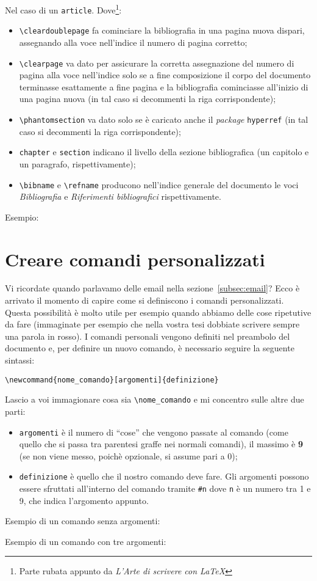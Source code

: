 
Nel caso di un \verb!article!. Dove\footnote{Parte rubata appunto da 
\textit{L'Arte di scrivere con \LaTeX{}}}:
\begin{itemize}
    \item \verb!\cleardoublepage! fa cominciare la bibliografia in una pagina 
    nuova dispari, assegnando alla voce nell’indice il numero di pagina 
    corretto;
    \item \verb!\clearpage! va dato per assicurare la corretta assegnazione 
    del numero di pagina alla voce nell’indice solo se a fine composizione il 
    corpo del documento terminasse esattamente a fine pagina e la bibliografia 
    cominciasse all’inizio di una pagina nuova (in tal caso si decommenti la 
    riga corrispondente);
    \item \verb!\phantomsection! va dato solo se è caricato anche il \textit{
    package} \verb!hyperref! (in tal caso si decommenti la riga 
    corrispondente);
    \item \verb!chapter! e \verb!section! indicano il livello della sezione 
    bibliografica (un capitolo e un paragrafo, rispettivamente);
    \item \verb!\bibname! e \verb!\refname! producono nell’indice generale del 
    documento le voci \emph{Bibliografia} e \emph{Riferimenti bibliografici}
    rispettivamente.
\end{itemize}
Esempio:



\section{Creare comandi personalizzati}
Vi ricordate quando parlavamo delle email nella sezione~\ref{subsec:email}? 
Ecco è arrivato il momento di capire come si definiscono i comandi 
personalizzati. Questa possibilità è molto utile per esempio quando abbiamo 
delle cose ripetutive da fare (immaginate per esempio che nella vostra tesi 
dobbiate scrivere sempre una parola in rosso). I comandi personali vengono 
definiti nel preambolo del documento e, per definire un nuovo comando, è 
necessario seguire la seguente sintassi: \\
\begin{center}
    \verb!\newcommand{nome_comando}[argomenti]{definizione}!
\end{center}
Lascio a voi immagionare cosa sia \verb!\nome_comando! e mi concentro sulle 
altre due parti:
\begin{itemize}
    \item \verb!argomenti! è il numero di ``cose'' che vengono passate al 
    comando (come quello che si passa tra parentesi graffe nei normali 
    comandi), il massimo è \textbf{9} (se non viene messo, poichè opzionale, 
    si assume pari a 0);
    \item \verb!definizione! è quello che il nostro comando deve fare. Gli 
    argomenti possono essere sfruttati all'interno del comando tramite 
    \verb!#n! dove \verb!n! è un numero tra 1 e 9, che indica l'argomento 
    appunto.
\end{itemize}

Esempio di un comando senza argomenti:


Esempio di un comando con tre argomenti:
